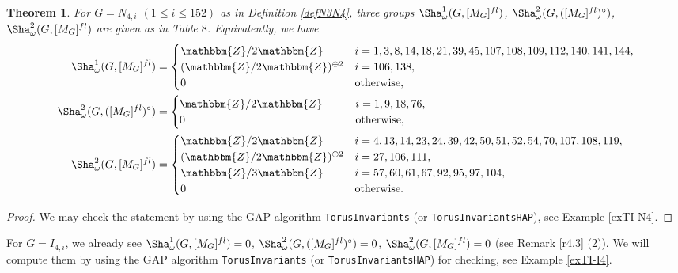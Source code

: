 \documentclass{amsart}
\theoremstyle{plain}
\newtheorem{theorem}{Theorem}[section]
\theoremstyle{definition}
\theoremstyle{remark}
\newcommand{\bZ}{\mathbbm{Z}}\newcommand{\bQ}{\mathbbm{Q}}
\begin{document}
\begin{theorem}\label{th4.6}
For $G=N_{4,i}$ $(1\leq i\leq 152)$ as in Definition \ref{defN3N4}, 
three groups $\Sha^1_\omega(G,[M_G]^{fl})$, 
$\Sha^2_\omega(G,([M_G]^{fl})^\circ)$, 
$\Sha^2_\omega(G,[M_G]^{fl})$ 
are given as in {\rm Table} $8$. 
Equivalently, we have 
\begin{align*}
\Sha^1_\omega(G,[M_G]^{fl})&=
\begin{cases}
\bZ/2\bZ& i=1,3,8,14,18,21,39,45,107,108,109,112,140,141,144,\\
(\bZ/2\bZ)^{\oplus 2}& i=106,138,\\
0&{\rm otherwise},
\end{cases}\\
\Sha^2_\omega(G,([M_G]^{fl})^\circ)&=
\begin{cases}
\bZ/2\bZ&\qquad i=1,9,18,76,\\
0&\qquad {\rm otherwise},
\end{cases}\\
\Sha^2_\omega(G,[M_G]^{fl})&=
\begin{cases}
\bZ/2\bZ& i=4,13,14,23,24,39,42,50,51,52,54,70,107,108,119,\\
(\bZ/2\bZ)^{\oplus 2}& i=27,106,111,\\
\bZ/3\bZ& i=57,60,61,67,92,95,97,104,\\
0&{\rm otherwise}.
\end{cases}
\end{align*}
\end{theorem}
\begin{proof}
We may check the statement 
by using the GAP algorithm 
{\tt TorusInvariants} (or {\tt TorusInvariantsHAP}), 
see Example \ref{exTI-N4}. 
\end{proof}

For $G=I_{4,i}$, we already see 
$\Sha^1_\omega(G,[M_G]^{fl})=0$, 
$\Sha^2_\omega(G,([M_G]^{fl})^\circ)=0$, $\Sha^2_\omega(G,[M_G]^{fl})=0$ 
(see Remark \ref{r4.3} (2)). 
We will compute them by using the GAP algorithm 
{\tt TorusInvariants} (or {\tt TorusInvariantsHAP}) for checking, 
see Example \ref{exTI-I4}.
\end{document}
